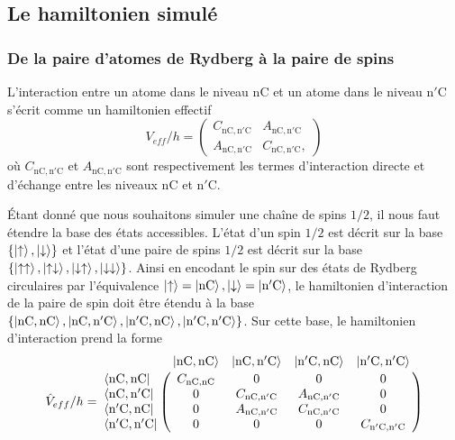 \subsection{Le hamiltonien simulé}\label{subsec:XXZhamiltonian}
\subsubsection*{De la paire d'atomes de Rydberg à la paire de spins}
\noindent L'interaction entre un atome dans le niveau $\mathrm{nC}$ et un atome dans le niveau $\mathrm{n'C}$ s'écrit comme un hamiltonien effectif
\begin{equation}
\label{eq:Veff_nCn'C}
V_{eff}/h = \left(\begin{array}{cc}
C_{\mathrm{nC},\mathrm{n'C}} & A_{\mathrm{nC},\mathrm{n'C}} \\
A_{\mathrm{nC},\mathrm{n'C}} & C_{\mathrm{nC},\mathrm{n'C}},
\end{array} \right)
\end{equation}
où $C_{\mathrm{nC},\mathrm{n'C}}$ et $A_{\mathrm{nC},\mathrm{n'C}}$ sont respectivement les termes d'interaction directe et d'échange entre les niveaux $\mathrm{nC}$ et $\mathrm{n'C}$.

Étant donné que nous souhaitons simuler une chaîne de spins $1/2$, il nous faut étendre la base des états accessibles.
L'état d'un spin $1/2$ est décrit sur la base $\{\ket{\uparrow},\ket{\downarrow}\}$ et l'état d'une paire de spins $1/2$ est décrit sur la base $\{ \ket{\uparrow \uparrow},\ket{\uparrow \downarrow}, \ket{\downarrow\uparrow}, \ket{\downarrow\downarrow} \}$.
Ainsi en encodant le spin sur des états de Rydberg circulaires par l'équivalence $\ket{\uparrow} = \ket{\mathrm{nC}} , \ket{\downarrow} = \ket{\mathrm{n'C}}$, le hamiltonien d'interaction de la paire de spin doit être étendu à la base 
$\{ \ket{\mathrm{nC},\mathrm{nC}},\ket{\mathrm{nC},\mathrm{n'C}}, \ket{\mathrm{n'C},\mathrm{nC}}, \ket{\mathrm{n'C},\mathrm{n'C}} \}$.
Sur cette base, le hamiltonien d'interaction prend la forme
\begin{equation}
\label{eq:V_eff_nCnC_n'Cn'c}
\hat{V}_{eff}/h = \bordermatrix{
~ 	&\ket{\mathrm{nC},\mathrm{nC}} 	&\ket{\mathrm{nC},\mathrm{n'C}} 
&\ket{\mathrm{n'C},\mathrm{nC}} &\ket{\mathrm{n'C},\mathrm{n'C}} \cr
	\bra{\mathrm{nC},\mathrm{nC}}	& C_{\mathrm{nC},\mathrm{nC}} & 0 & 0 & 0 \cr 
	\bra{\mathrm{nC},\mathrm{n'C}} 	& 0 & C_{\mathrm{nC},\mathrm{n'C}} & A_{\mathrm{nC},\mathrm{n'C}} & 0 \cr
	\bra{\mathrm{n'C},\mathrm{nC}} 	& 0 & A_{\mathrm{nC},\mathrm{n'C}} & C_{\mathrm{nC},\mathrm{n'C}} & 0 \cr
	\bra{\mathrm{n'C},\mathrm{n'C}} & 0 & 0 &  0	& C_{\mathrm{n'C},\mathrm{n'C}}\cr
	}
\end{equation}


